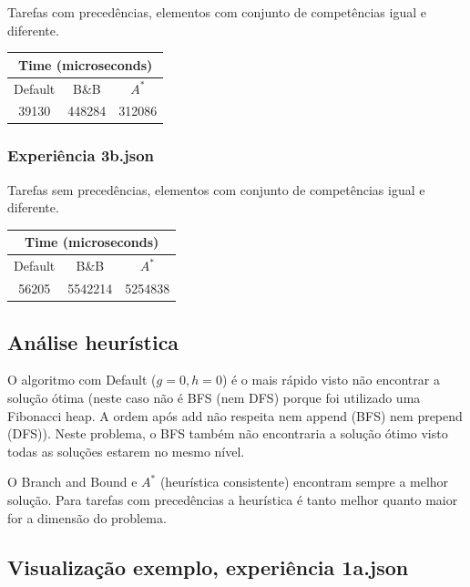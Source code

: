 \documentclass[a4paper,11pt]{article}
\begin{document}
Tarefas com precedências, elementos com conjunto de competências igual e diferente.

\begin{center}
	\begin{tabular}{|c|c|c|} 
		\hline
		\multicolumn{3}{|c|}{Time (microseconds)} \\
		\hline
		Default & B\&B & $A^*$\\
		\hline
		39130 & 448284 & 312086\\
		\hline
	\end{tabular}
\end{center}

\subsubsection{Experiência 3b.json}

Tarefas sem precedências, elementos com conjunto de competências igual e diferente.

\begin{center}
	\begin{tabular}{|c|c|c|} 
		\hline
		\multicolumn{3}{|c|}{Time (microseconds)} \\
		\hline
		Default & B\&B & $A^*$\\
		\hline
		56205 & 5542214 & 5254838\\
		\hline
	\end{tabular}
\end{center}

\subsection{Análise heurística}

O algoritmo com Default ($g = 0, h = 0$) é o mais rápido visto não encontrar a solução ótima (neste caso não é BFS (nem DFS) porque foi utilizado uma Fibonacci heap. A ordem após add não respeita nem append (BFS) nem prepend (DFS)). Neste problema, o BFS também não encontraria a solução ótimo visto todas as soluções estarem no mesmo nível.

O Branch and Bound e $A^*$ (heurística consistente) encontram sempre a melhor solução. Para tarefas com precedências a heurística é tanto melhor quanto maior for a dimensão do problema.

\subsection{Visualização exemplo, experiência 1a.json}
\end{document}
